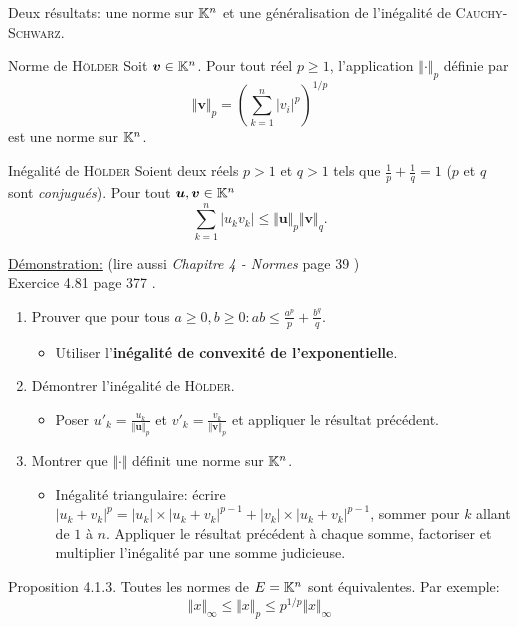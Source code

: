 Deux résultats: une norme sur $\mathbb{K}^n$ et une généralisation de l'inégalité de \textsc{Cauchy}-\textsc{Schwarz}. 
\begin{box_titre}{Norme de \textsc{Hölder}}
    Soit $\bm{v} \in \mathbb{K}^n$. Pour tout réel $p \geqslant 1$, l'application $\Vert \bm{\cdot} \Vert_p$ définie par
    $$\Vert \bm{v} \Vert_p = \left (\sum_{k=1}^{n} |v_i|^p \right)^{1/p}$$
    est une norme sur $\mathbb{K}^n$.
\end{box_titre}

\begin{box_titre}{Inégalité de \textsc{Hölder}}
    Soient deux réels $p > 1$ et $q > 1$ tels que $\frac{1}{p} + \frac{1}{q} = 1$ ($p$ et $q$ sont \emph{conjugués}). Pour tout $\bm{u}, \bm{v} \in \mathbb{K}^n$
    $$\sum_{k=1}^{n} |u_k v_k| \leqslant \Vert \bm{u} \Vert_p \Vert \bm{v} \Vert_q.$$
\end{box_titre}

\underline{Démonstration:} (lire aussi \emph{Chapitre 4 - Normes} page 39 \cite{matrices}) \\
Exercice 4.81 page 377 \cite{oraux_x_ens_3}.
\begin{enumerate}
    \item Prouver que pour tous $a \geqslant 0, b \geqslant 0: ab \leqslant \frac{a^p}{p} + \frac{b^q}{q}$.
    \begin{itemize}
        \item Utiliser l'\textbf{inégalité de convexité de l'exponentielle}.
    \end{itemize}
    \item Démontrer l'inégalité de \textsc{Hölder}.
    \begin{itemize}
        \item Poser $u'_k = \frac{u_k}{\Vert \bm{u} \Vert_p}$ et $v'_k = \frac{v_k}{\Vert \bm{v} \Vert_p}$ et appliquer le résultat précédent. 
    \end{itemize}
    \item Montrer que $\Vert \bm{\cdot} \Vert$ définit une norme sur $\mathbb{K}^n$.
    \begin{itemize}
        \item Inégalité triangulaire: écrire $\boxed{|u_k + v_k|^p = |u_k| \times |u_k + v_k|^{p-1} + |v_k| \times |u_k + v_k|^{p-1}}$, sommer pour $k$ allant de $1$ à $n$. Appliquer le résultat précédent à chaque somme, factoriser et multiplier l'inégalité par une somme judicieuse. 
    \end{itemize}
\end{enumerate}
    
\begin{box_titre}{Proposition 4.1.3. \cite{matrices}}
    Toutes les normes de $E = \mathbb{K}^n$ sont équivalentes. Par exemple:
    $$\Vert x \Vert_\infty \leqslant \Vert x \Vert_p \leqslant p^{1/p} \Vert x \Vert_\infty$$
\end{box_titre}